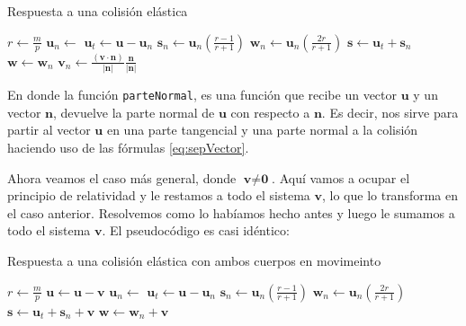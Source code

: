 {\centering
\begin{minipage}{\linewidth}
  \begin{algorithm}[H]
    \caption{Respuesta a una colisión elástica}
    \label{alg:elas}
    \begin{algorithmic}[1] %
\State $r \gets \frac{m}{p}$
\State $\textbf{u}_n \gets$ 
\State $\textbf{u}_t \gets \textbf{u} - \textbf{u}_n$
\State $\textbf{s}_n \gets \textbf{u}_n \left( \frac{r - 1}{r + 1} \right) $
\State $\textbf{w}_n \gets \textbf{u}_n \left( \frac{2r}{r + 1} \right) $
\State $\textbf{s} \gets \textbf{u}_t + \textbf{s}_n$
\State $\textbf{w} \gets \textbf{w}_n$
\State {}
\EndProcedure
{}
\State $\textbf{v}_n \gets \frac{(\textbf{v} \cdot \textbf{n})}{|\textbf{n}|} \frac{\textbf{n}}{|\textbf{n}|}$
\State {}
\EndProcedure
    \end{algorithmic}
  \end{algorithm}
\end{minipage}
\par
}

En donde la función \verb|parteNormal|, es una función que recibe un vector $\textbf{u}$ y un vector $\textbf{n}$, devuelve la parte normal de $\textbf{u}$ con respecto a $\textbf{n}$.
Es decir, nos sirve para partir al vector $\textbf{u}$ en una parte tangencial y una parte normal a la colisión haciendo uso de las fórmulas \eqref{eq:sepVector}.

Ahora veamos el caso más general, donde $\textbf{v} \neq \textbf{0}$. Aquí vamos a ocupar el principio de relatividad y le restamos a todo el sistema $\textbf{v}$, lo que lo transforma en el caso anterior. Resolvemos como lo habíamos hecho antes y luego le sumamos a todo el sistema $\textbf{v}$. El pseudocódigo es casi idéntico:
 
{\centering
\begin{minipage}{\linewidth}
  \begin{algorithm}[H]
    \caption{Respuesta a una colisión elástica con ambos cuerpos en movimeinto}
    \label{alg:elasmov}
    \begin{algorithmic}[1] %
\State $r \gets \frac{m}{p}$
\State $\textbf{u} \gets \textbf{u} - \textbf{v}$
\State $\textbf{u}_n \gets$ 
\State $\textbf{u}_t \gets \textbf{u} - \textbf{u}_n$
\State $\textbf{s}_n \gets \textbf{u}_n \left( \frac{r - 1}{r + 1} \right) $
\State $\textbf{w}_n \gets \textbf{u}_n \left( \frac{2r}{r + 1} \right) $
\State $\textbf{s} \gets \textbf{u}_t + \textbf{s}_n + \textbf{v}$
\State $\textbf{w} \gets \textbf{w}_n + \textbf{v}$
\State {}
\EndProcedure
    \end{algorithmic}
  \end{algorithm}
\end{minipage}
\par
}

